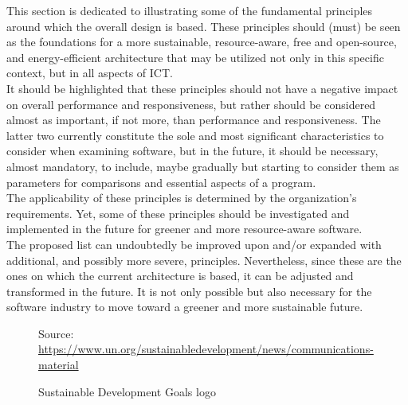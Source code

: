 This section is dedicated to illustrating some of the fundamental principles
around which the overall design is based. These principles should (must) be seen
as the foundations for a more sustainable, resource-aware, free and open-source,
and energy-efficient architecture that may be utilized not only in this specific
context, but in all aspects of ICT. \\ %
It should be highlighted that these principles should not have a negative impact
on overall performance and responsiveness, but rather should be considered
almost as important, if not more, than performance and responsiveness. The latter
two currently constitute the sole and most significant characteristics to consider
when examining software, but in the future, it should be necessary, almost
mandatory, to include, maybe gradually but starting to consider them as
parameters for comparisons and essential aspects of a program. \\ %
The applicability of these principles is determined by the organization's
requirements. Yet, some of these principles should be investigated and
implemented in the future for greener and more resource-aware software. \\ %
The proposed list can undoubtedly be improved upon and/or expanded with
additional, and possibly more severe, principles. Nevertheless, since these are
the ones on which the current architecture is based, it can be adjusted and transformed
in the future. It is not only possible but also necessary for the software
industry to move toward a greener and more sustainable future. \\ %

\begin{figure} %
  \centering
  \def\stackalignment{r} %
  {\scriptsize \parbox[t]{\linewidth}{ Source: \url{https://www.un.org/sustainabledevelopment/news/communications-material}} }
  \caption{Sustainable Development Goals logo}
\end{figure}

